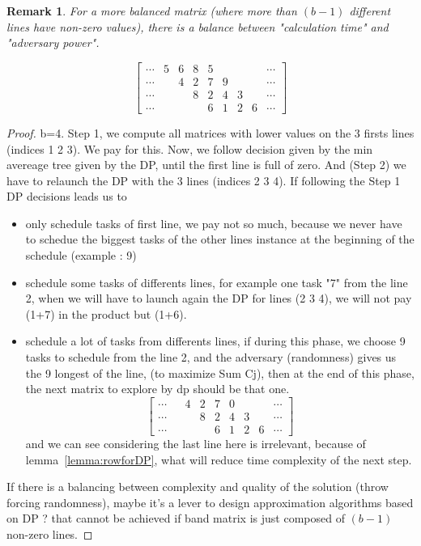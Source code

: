 \documentclass{article}
\newtheorem{remark}{Remark}
\begin{document}
\begin{remark}For a more balanced matrix (where more than $(b-1)$ different lines have non-zero values), there is a balance between "calculation time" and "adversary power".

\[\begin{bmatrix}  
\cdots & 5 & 6 & 8 & 5 &  &  & &\cdots \\  
\cdots &  & 4 & 2 & 7 & 9 &  & &\cdots  \\ 
\cdots &  &    & 8 & 2 & 4 & 3 & &\cdots  \\   
\cdots &  &    &    & 6 & 1 & 2 & 6& \cdots 
\end{bmatrix}  \]
\end{remark}\begin{proof}
b=4. Step 1, we compute all matrices with lower values on the 3 firsts lines (indices 1 2 3). We pay for this. Now, we follow decision given by the min avereage tree given by the DP, until the first line is full of zero. And (Step 2) we have to relaunch the DP with the 3 lines (indices 2 3 4). If following the Step 1 DP decisions leads us to\begin{itemize}
\item only schedule tasks of first line, we pay not so much, because we never have to schedue the biggest tasks of the other lines instance at the beginning of the schedule (example : 9)
\item schedule some tasks of differents lines, for example one task "7" from the line 2, when we will have to launch again the DP for lines (2 3 4), we will not pay (1+7) in the product but (1+6).
\item schedule a lot of tasks from differents lines, if during this phase, we choose 9 tasks to schedule from the line 2, and the adversary (randomness) gives us the 9 longest of the line, (to maximize Sum Cj), then at the end of this phase, the next matrix to explore by dp should be that one.
\[\begin{bmatrix}  
\cdots &  & 4 & 2 & 7 & 0 &  & &\cdots  \\ 
\cdots &  &    & 8 & 2 & 4 & 3 & &\cdots  \\   
\cdots &  &    &    & 6 & 1 & 2 & 6& \cdots 
\end{bmatrix}  \]
and we can see considering the last line here is irrelevant, because of lemma~\ref{lemma:rowforDP}, what will reduce time complexity of the next step.
\end{itemize}
If there is a balancing between complexity and quality of the solution (throw forcing randomness), maybe it's a lever to design approximation algorithms based on DP ? that cannot be achieved if band matrix is just composed of $(b-1)$ non-zero lines.  \end{proof}
\end{document}
